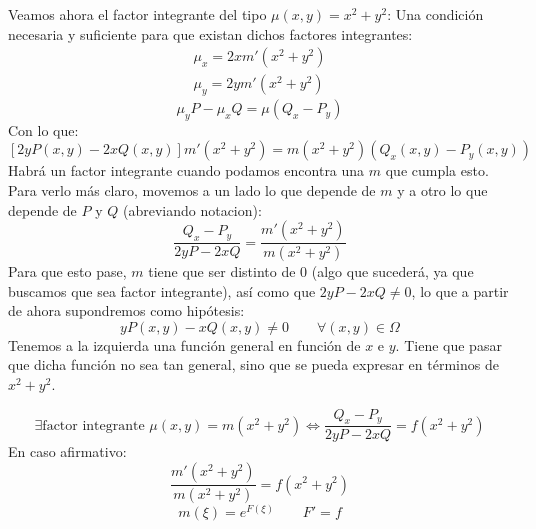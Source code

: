Veamos ahora el factor integrante del tipo $\mu(x,y)=x^2+y^2$:
Una condición necesaria y suficiente para que existan dichos factores integrantes:
\begin{gather*}
    \mu_x = 2xm'(x^2+y^2) \\
    \mu_y = 2ym'(x^2+y^2)
\end{gather*}
\begin{equation*}
    \mu_y P - \mu_x Q = \mu (Q_x - P_y) 
\end{equation*} 
Con lo que:
\begin{equation*}
    \left[2yP(x,y)-2xQ(x,y)\right]m'(x^2+y^2) = m(x^2+y^2)(Q_x(x,y)-P_y(x,y))
\end{equation*}
Habrá un factor integrante cuando podamos encontra una $m$ que cumpla esto. Para verlo más claro, movemos a un lado lo que depende de $m$ y a otro lo que depende de $P$ y $Q$ (abreviando notacion):
\begin{equation*}
    \dfrac{Q_x-P_y}{2yP-2xQ} = \dfrac{m'(x^2+y^2)}{m(x^2+y^2)}
\end{equation*}
Para que esto pase, $m$ tiene que ser distinto de $0$ (algo que sucederá, ya que buscamos que sea factor integrante), así como que $2yP-2xQ \neq 0$, lo que a partir de ahora supondremos como hipótesis:
\begin{equation*}
    yP(x,y) - xQ(x,y) \neq 0 \qquad \forall (x,y)\in \Omega
\end{equation*}
Tenemos a la izquierda una función general en función de $x$ e $y$. Tiene que pasar que dicha función no sea tan general, sino que se pueda expresar en términos de $x^2 + y^2$.

\begin{equation*}
    \exists \text{factor integrante\ } \mu(x,y) = m(x^2+y^2) \Longleftrightarrow \dfrac{Q_x-P_y}{2yP-2xQ} = f(x^2+y^2)
\end{equation*}
En caso afirmativo:
\begin{equation*}
    \dfrac{m'(x^2+y^2)}{m(x^2+y^2)} = f(x^2+y^2)
\end{equation*}
\begin{equation*}
    m(\xi) = e^{F(\xi)} \qquad F' = f
\end{equation*}

